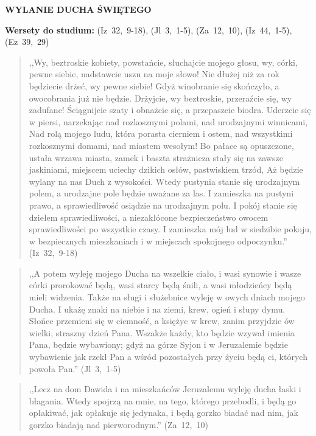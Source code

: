\documentclass[10pt,a4paper,oneside]{article}
\begin{document}
\centerline{\textbf{\MakeUppercase{Wylanie Ducha Świętego}}}
\begin{center}
\textbf{Wersety do studium:} \mbox{(Iz 32, 9-18)}, \mbox{(Jl 3, 1-5)}, \mbox{(Za 12, 10)}, \mbox{(Iz 44, 1-5)}, \mbox{(Ez 39, 29)}
\end{center}
\begin{quote}
,,Wy, beztroskie kobiety, powstańcie, słuchajcie mojego głosu, wy, córki, pewne siebie, nadstawcie uszu na moje słowo! Nie dłużej niż za rok będziecie drżeć, wy pewne siebie! Gdyż winobranie się skończyło, a owocobrania już nie będzie. Drżyjcie, wy beztroskie, przeraźcie się, wy zadufane! Ściągnijcie szaty i obnażcie się, a przepaszcie biodra. Uderzcie się w piersi, narzekając nad rozkosznymi polami, nad urodzajnymi winnicami, Nad rolą mojego ludu, która porasta cierniem i ostem, nad wszystkimi rozkosznymi domami, nad miastem wesołym! Bo pałace są opuszczone, ustała wrzawa miasta, zamek i baszta strażnicza stały się na zawsze jaskiniami, miejscem uciechy dzikich osłów, pastwiskiem trzód, Aż będzie wylany na nas Duch z wysokości. Wtedy pustynia stanie się urodzajnym polem, a urodzajne pole będzie uważane za las. I zamieszka na pustyni prawo, a sprawiedliwość osiądzie na urodzajnym polu. I pokój stanie się dziełem sprawiedliwości, a niezakłócone bezpieczeństwo owocem sprawiedliwości po wszystkie czasy. I zamieszka mój lud w siedzibie pokoju, w bezpiecznych mieszkaniach i w miejscach spokojnego odpoczynku.'' \mbox{(Iz 32, 9-18)}
\end{quote}
\begin{quote}
,,A potem wyleję mojego Ducha na wszelkie ciało, i wasi synowie i wasze córki prorokować będą, wasi starcy będą śnili, a wasi młodzieńcy będą mieli widzenia. Także na sługi i służebnice wyleję w owych dniach mojego Ducha. I ukażę znaki na niebie i na ziemi, krew, ogień i słupy dymu. Słońce przemieni się w ciemność, a księżyc w krew, zanim przyjdzie ów wielki, straszny dzień Pana. Wszakże każdy, kto będzie wzywał imienia Pana, będzie wybawiony; gdyż na górze Syjon i w Jeruzalemie będzie wybawienie jak rzekł Pan a wśród pozostałych przy życiu będą ci, których powoła Pan.'' \mbox{(Jl 3, 1-5)}
\end{quote}
\begin{quote}
,,Lecz na dom Dawida i na mieszkańców Jeruzalemu wyleję ducha łaski i błagania. Wtedy spojrzą na mnie, na tego, którego przebodli, i będą go opłakiwać, jak opłakuje się jedynaka, i będą gorzko biadać nad nim, jak gorzko biadają nad pierworodnym.'' \mbox{(Za 12, 10)}
\end{quote}
\end{document}
